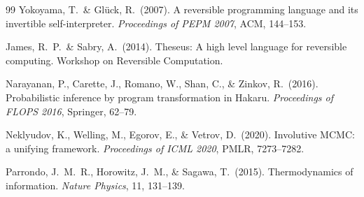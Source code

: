 \documentclass[11pt,a4paper]{article}
\begin{document}
\begin{thebibliography}{99}
Yokoyama, T.\ \& Gl\"{u}ck, R.\ (2007). A reversible programming language and its invertible
self-interpreter. \textit{Proceedings of PEPM 2007}, ACM, 144--153.

James, R.\ P.\ \& Sabry, A.\ (2014). Theseus: A high level language for reversible computing.
Workshop on Reversible Computation.

Narayanan, P., Carette, J., Romano, W., Shan, C., \& Zinkov, R.\ (2016).
Probabilistic inference by program transformation in Hakaru.
\textit{Proceedings of FLOPS 2016}, Springer, 62--79.

Neklyudov, K., Welling, M., Egorov, E., \& Vetrov, D.\ (2020).
Involutive MCMC: a unifying framework.
\textit{Proceedings of ICML 2020}, PMLR, 7273--7282.

Parrondo, J.\ M.\ R., Horowitz, J.\ M., \& Sagawa, T.\ (2015).
Thermodynamics of information. \textit{Nature Physics}, 11, 131--139.

\end{thebibliography}
\end{document}
